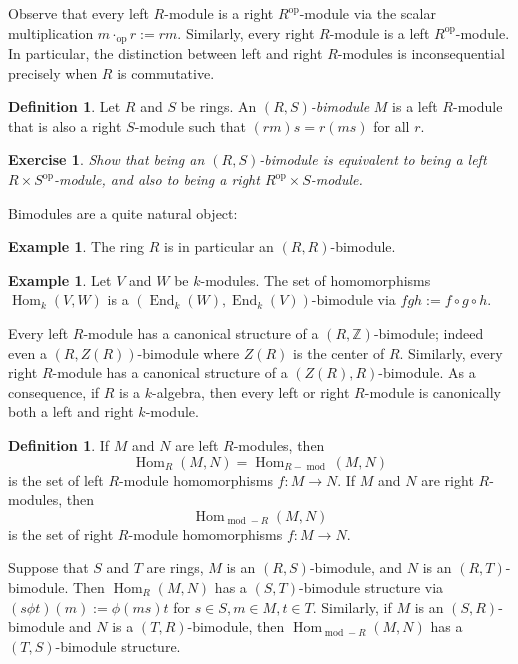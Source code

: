\documentclass[12pt]{article}
\theoremstyle{plain}
\newtheorem{exercise}[theorem]{Exercise}
\theoremstyle{definition}
\newtheorem{definition}[theorem]{Definition}
\newtheorem{example}[theorem]{Example}
\theoremstyle{remark}
\numberwithin{equation}{section}
\begin{document}
Observe that every left $R$-module is a right $R^{\mathrm{op}}$-module
via the scalar multiplication $m \cdot_{\mathrm{op}} r := rm$.
Similarly, every right $R$-module is a left $R^{\mathrm{op}}$-module.
In particular, the distinction between left and right
$R$-modules is inconsequential precisely when $R$ is commutative.

\begin{definition}
Let $R$ and $S$ be rings.  An \emph{$(R,S)$-bimodule} $M$ is a left
$R$-module that is also a right $S$-module such that $(rm)s=r(ms)$ for
all $r$.
\end{definition}

\begin{exercise}
Show that being an $(R,S)$-bimodule is equivalent to being a
left $R \times S^{\mathrm{op}}$-module, and also to being
a right $R^{\mathrm{op}} \times S$-module.
\end{exercise}

Bimodules are a quite natural object:

\begin{example}
The ring $R$ is in particular an $(R,R)$-bimodule.
\end{example}

\begin{example}
Let $V$ and $W$ be $k$-modules.  The set of homomorphisms
$\operatorname{Hom}_k(V,W)$ is a
$(\operatorname{End}_k(W),\operatorname{End}_k(V))$-bimodule
via $fgh := f \circ g \circ h$.
\end{example}

Every left $R$-module has a canonical structure of a
$(R,\mathbb{Z})$-bimodule; indeed even a $(R,Z(R))$-bimodule where
$Z(R)$ is the center of $R$.
Similarly, every right $R$-module has a canonical structure of
a $(Z(R),R)$-bimodule.
As a consequence, if $R$ is a $k$-algebra, then every left or right
$R$-module is canonically both a left and right $k$-module.

\begin{definition}
If $M$ and $N$ are left $R$-modules, then
\[
\operatorname{Hom}_R(M,N) = \operatorname{Hom}_{R-\operatorname{mod}}(M,N)
\]
is the set of left $R$-module homomorphisms $f : M \to N$.
If $M$ and $N$ are right $R$-modules, then
\[
\operatorname{Hom}_{\operatorname{mod}-R}(M,N)
\]
is the set of right $R$-module homomorphisms $f : M \to N$.
\end{definition}

Suppose that $S$ and $T$ are rings,
$M$ is an $(R,S)$-bimodule, and $N$ is an $(R,T)$-bimodule.
Then $\operatorname{Hom}_R(M,N)$ has a $(S,T)$-bimodule structure
via $(s\phi t)(m):=\phi(ms)t$ for $s \in S, m \in M, t\in T$.
Similarly, if $M$ is an $(S,R)$-bimodule and $N$ is a $(T,R)$-bimodule,
then $\operatorname{Hom}_{\operatorname{mod}-R}(M,N)$
has a $(T,S)$-bimodule structure.
\end{document}

